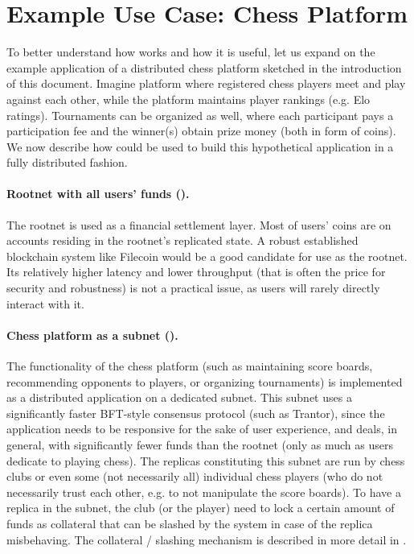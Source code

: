 \section{Example Use Case: Chess Platform}
\label{sec:example-use-case}

To better understand how \ipc works and how it is useful, let us expand on the example application of a distributed chess platform sketched in the introduction of this document.
Imagine platform where registered chess players meet and play against each other, while the platform maintains player rankings (e.g. Elo ratings).
Tournaments can be organized as well, where each participant pays a participation fee and the winner(s) obtain prize money (both in form of coins).
We now describe how \ipc could be used to build this hypothetical application in a fully distributed fashion.

\paragraph{Rootnet with all users' funds ().}
The rootnet is used as a financial settlement layer.
Most of users' coins are on accounts residing in the rootnet's replicated state.
A robust established blockchain system like Filecoin would be a good candidate for use as the rootnet.
Its relatively higher latency and lower throughput (that is often the price for security and robustness) is not a practical issue,
as users will rarely directly interact with it.

\paragraph{Chess platform as a subnet ().}
The functionality of the chess platform
(such as maintaining score boards, recommending opponents to players, or organizing tournaments)
is implemented as a distributed application on a dedicated subnet.
This subnet uses a significantly faster BFT-style consensus protocol (such as Trantor),
since the application needs to be responsive for the sake of user experience,
and deals, in general, with significantly fewer funds than the rootnet (only as much as users dedicate to playing chess).
The replicas constituting this subnet are run by chess clubs or even some (not necessarily all) individual chess players
(who do not necessarily trust each other, e.g. to not manipulate the score boards).
To have a replica in the  subnet, the club (or the player) need to lock a certain amount of funds as collateral that can be slashed by the system in case of the replica misbehaving.
The collateral / slashing mechanism is described in more detail in .

